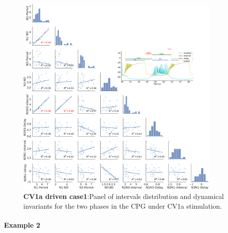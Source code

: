 \begin{figure}[htbp]
	\centering
	\includegraphics[width=0.9\textwidth]{./invariants/data/SUSSEX/CV1a_driven1/images/2phases/panel_with_pairplot.pdf}
	\caption{\textbf{CV1a driven case1}:Panel of intervals distribution and dynamical invariants for the two phases in the CPG under CV1a stimulation.}
	\label{fig:cv1a 1 2phases pairplot}
\end{figure}



\paragraph{Example 2}


